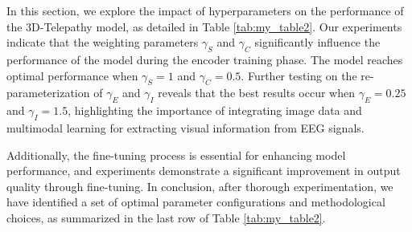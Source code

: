 \documentclass[conference]{IEEEtran}
\begin{document}
\begin{table}[htbp]
\caption{Experiments on the effect of hyper-parameters and fine-tuning on results. The best results are shown in bold.}
\label{tab:my_table2}
\centering
\tiny

\end{table}
In this section, we explore the impact of hyperparameters on the performance of the 3D-Telepathy model, as detailed in Table \ref{tab:my_table2}. Our experiments indicate that the weighting parameters \(\gamma_S\) and \(\gamma_C\) significantly influence the performance of the model during the encoder training phase. The model reaches optimal performance when \(\gamma_S = 1\) and \(\gamma_C = 0.5\). Further testing on the re-parameterization of \(\gamma_E\) and \(\gamma_I\) reveals that the best results occur when \(\gamma_E = 0.25\) and \(\gamma_I = 1.5\), highlighting the importance of integrating image data and multimodal learning for extracting visual information from EEG signals. 

Additionally, the fine-tuning process is essential for enhancing model performance, and experiments demonstrate a significant improvement in output quality through fine-tuning. In conclusion, after thorough experimentation, we have identified a set of optimal parameter configurations and methodological choices, as summarized in the last row of Table \ref{tab:my_table2}.
\end{document}
